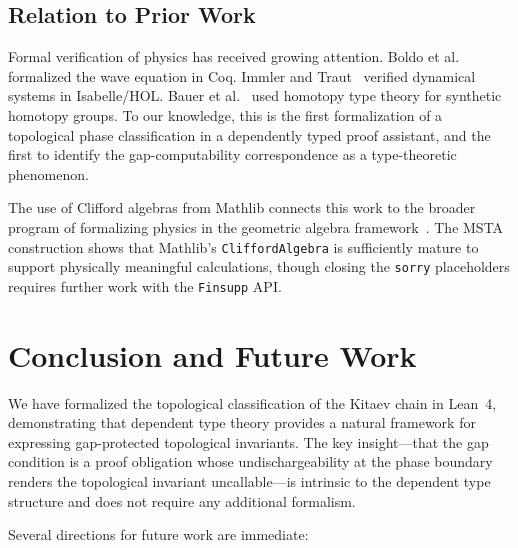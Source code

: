 \documentclass[11pt,a4paper]{article}
\newcommand{\lean}[1]{\lstinline[language=Lean4]{#1}}
\begin{document}
\subsection{Relation to Prior Work}

Formal verification of physics has received growing attention. Boldo et al.~\cite{Boldo2013} formalized the wave equation in Coq. Immler and Traut~\cite{Immler2019} verified dynamical systems in Isabelle/HOL. Bauer et al.~\cite{Bauer2017} used homotopy type theory for synthetic homotopy groups. To our knowledge, this is the first formalization of a topological phase classification in a dependently typed proof assistant, and the first to identify the gap-computability correspondence as a type-theoretic phenomenon.

The use of Clifford algebras from Mathlib connects this work to the broader program of formalizing physics in the geometric algebra framework~\cite{Doran2003,Hestenes2015}. The MSTA construction shows that Mathlib's \lean{CliffordAlgebra} is sufficiently mature to support physically meaningful calculations, though closing the \lean{sorry} placeholders requires further work with the \lean{Finsupp} API.

\section{Conclusion and Future Work}

We have formalized the topological classification of the Kitaev chain in Lean~4, demonstrating that dependent type theory provides a natural framework for expressing gap-protected topological invariants. The key insight---that the gap condition is a proof obligation whose undischargeability at the phase boundary renders the topological invariant uncallable---is intrinsic to the dependent type structure and does not require any additional formalism.

Several directions for future work are immediate:
\end{document}
